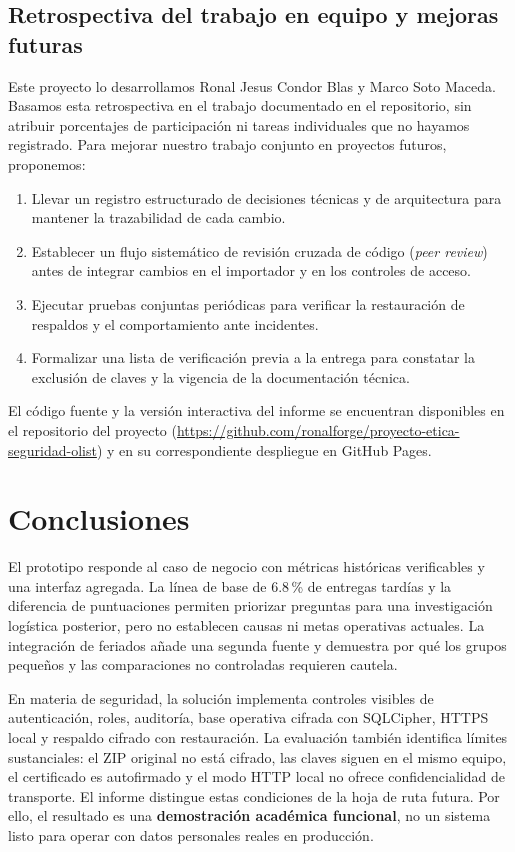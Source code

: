 \documentclass[12pt,a4paper]{article}
\begin{document}
\subsection{Retrospectiva del trabajo en equipo y mejoras futuras}
Este proyecto lo desarrollamos Ronal Jesus Condor Blas y Marco Soto Maceda. Basamos esta retrospectiva en el trabajo documentado en el repositorio, sin atribuir porcentajes de participación ni tareas individuales que no hayamos registrado. Para mejorar nuestro trabajo conjunto en proyectos futuros, proponemos:
\begin{enumerate}
\item Llevar un registro estructurado de decisiones técnicas y de arquitectura para mantener la trazabilidad de cada cambio.
\item Establecer un flujo sistemático de revisión cruzada de código (\emph{peer review}) antes de integrar cambios en el importador y en los controles de acceso.
\item Ejecutar pruebas conjuntas periódicas para verificar la restauración de respaldos y el comportamiento ante incidentes.
\item Formalizar una lista de verificación previa a la entrega para constatar la exclusión de claves y la vigencia de la documentación técnica.
\end{enumerate}
El código fuente y la versión interactiva del informe se encuentran disponibles en el repositorio del proyecto (\url{https://github.com/ronalforge/proyecto-etica-seguridad-olist}) y en su correspondiente despliegue en GitHub Pages.

\section{Conclusiones}
El prototipo responde al caso de negocio con métricas históricas verificables y una interfaz agregada. La línea de base de 6.8\,\% de entregas tardías y la diferencia de puntuaciones permiten priorizar preguntas para una investigación logística posterior, pero no establecen causas ni metas operativas actuales. La integración de feriados añade una segunda fuente y demuestra por qué los grupos pequeños y las comparaciones no controladas requieren cautela.

En materia de seguridad, la solución implementa controles visibles de autenticación, roles, auditoría, base operativa cifrada con SQLCipher, HTTPS local y respaldo cifrado con restauración. La evaluación también identifica límites sustanciales: el ZIP original no está cifrado, las claves siguen en el mismo equipo, el certificado es autofirmado y el modo HTTP local no ofrece confidencialidad de transporte. El informe distingue estas condiciones de la hoja de ruta futura. Por ello, el resultado es una \textbf{demostración académica funcional}, no un sistema listo para operar con datos personales reales en producción.
\end{document}
